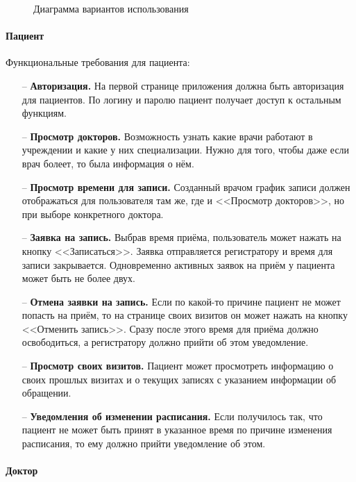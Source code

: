 \documentclass[a4paper,article]{article}
\begin{document}
\begin{sloppypar}
\begin{figure}[h]
            \caption{\centering Диаграмма вариантов использования}

            \label{fig:Диаграмма вариантов использования}

        \end{figure}

    \paragraph{Пациент}\label{ТЗ. Пациент}

    Функциональные требования для пациента:

    \begin{itemize}[nolistsep]
        \item[--] \textbf{Авторизация.} На первой странице приложения должна быть авторизация для пациентов. По логину и паролю пациент получает доступ к остальным функциям.
        \item[--] \textbf{Просмотр докторов.} Возможность узнать какие врачи работают в учреждении и какие у них специализации. Нужно для того, чтобы даже если врач болеет, то была информация о нём.
        \item[--] \textbf{Просмотр времени для записи.} Созданный врачом график записи должен отображаться для пользователя там же, где и <<Просмотр докторов>>, но при выборе конкретного доктора.
        \item[--] \textbf{Заявка на запись.} Выбрав время приёма, пользователь может нажать на кнопку <<Записаться>>. Заявка отправляется регистратору и время для записи закрывается. Одновременно активных заявок на приём у пациента может быть не более двух.
        \item[--] \textbf{Отмена заявки на запись.} Если по какой-то причине пациент не может попасть на приём, то на странице своих визитов он может нажать на кнопку <<Отменить запись>>. Сразу после этого время для приёма должно освободиться, а регистратору должно прийти об этом уведомление.
        \item[--] \textbf{Просмотр своих визитов.} Пациент может просмотреть информацию о своих прошлых визитах и о текущих записях с указанием информации об обращении.
        \item[--] \textbf{Уведомления об изменении расписания.} Если получилось так, что пациент не может быть принят в указанное время по причине изменения расписания, то ему должно прийти уведомление об этом.
    \end{itemize}

    \paragraph{Доктор}\label{ТЗ. Доктор}


\end{sloppypar}
\end{document}
